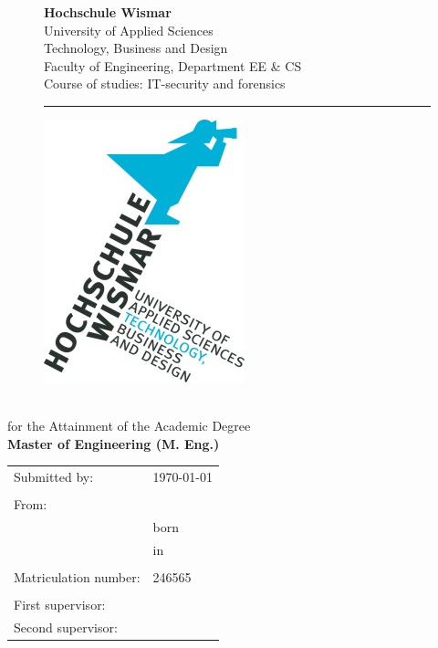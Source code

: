 \begin{titlepage}
	\setlength\headsep{-5mm}
	\begin{figure}[!h]
		\begin{minipage}{0.8\textwidth}
			\textbf{Hochschule Wismar} \\
			University of Applied Sciences \\
			Technology, Business and Design \\
			Faculty of Engineering, Department EE \&{} CS \\
			Course of studies: IT-security and forensics\\
		\rule{\textwidth}{0.5pt}
		\end{minipage}
		\begin{minipage}[r]{0.1\textwidth}
			\begin{flushright}
				\includegraphics[height=6\baselineskip]{pics/HSLogo.jpg}
			\end{flushright}
		\end{minipage}
	\end{figure}
	\vspace*{4cm}
	\begin{center}
		\Huge
		\textbf{\documentType} \\[4pt]
		\normalsize for the Attainment of the Academic Degree \\[3pt]
		\large \textbf{Master of Engineering (M. Eng.)} \\
		\vspace{2cm}
		\Large \thetitle
		\begin{table}[b]
			\centering
			\begin{tabular}{ll}
				Submitted by: & \today \\
				\\
				From: & \theauthor \\
				& born \birthday \\
				& in \birthplace \\
				\\
				Matriculation number: & 246565 \\
				\\
				First supervisor: & \firstTutor \\
				Second supervisor: & \secondTutor
			\end{tabular}
		\end{table}
	\end{center}
\end{titlepage}
